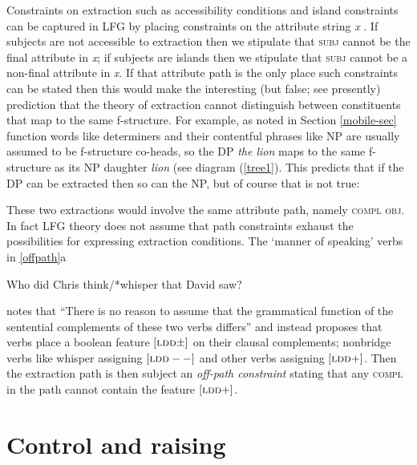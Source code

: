 Constraints on extraction such as accessibility conditions and island constraints  can be captured in LFG by placing constraints on the attribute string \textit{x} \citep{Dalrymple2001a-u}.  If subjects are not accessible to extraction then we stipulate that \textsc{subj} cannot be the final attribute in \textit{x}; if subjects are islands then we stipulate that \textsc{subj} cannot be a non-final attribute in \textit{x}.  If that attribute path is the only place such constraints can be stated then this would make the interesting (but false; see presently) prediction that the theory of extraction cannot distinguish between constituents that map to the same f-structure.  For example, as noted in Section \ref{mobile-sec} function words like determiners and their contentful phrases like NP are usually assumed to be f-structure co-heads, so the DP \textit{the lion} maps to the same f-structure as its NP daughter \textit{lion} (see diagram (\ref{tree1}).  This predicts that if the DP can be extracted then so can the NP, but of course that is not true:

\begin{exe} 
\ex	\label{nope}
\begin{xlist}
\end{xlist}
\end{exe}
These two extractions would involve the same attribute path, namely \textsc{compl obj}.  In fact LFG theory does not assume that path constraints exhaust the possibilities for expressing extraction conditions.   The `manner of speaking' verbs in \ref{offpath}a

\begin{exe} 
\ex	\label{manner}
Who did Chris think/*whisper that David saw?
\end{exe}
\citet{Dalrymple2001a-u} notes that ``There is no reason to assume that the grammatical function of the sentential complements of these two verbs differs'' and instead proposes that  verbs place a boolean feature 
$[\textsc{ldd} \pm]$ on their clausal complements; nonbridge verbs like whisper assigning $[\textsc{ldd} --]$ and other verbs assigning $[\textsc{ldd} +]$.  Then the extraction path is then subject an \textit{off-path constraint} stating that any \textsc{compl} in the path cannot contain the feature $[\textsc{ldd} +]$.  


\section{Control and raising}

